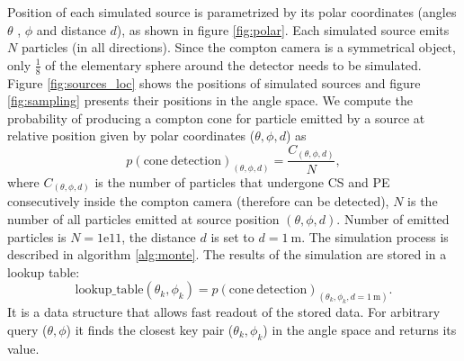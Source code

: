 Position of each simulated source is parametrized by its polar coordinates (angles $\theta$ , $\phi$ and distance $d$), as shown in figure \ref{fig:polar}.
Each simulated source emits $N$ particles (in all directions).
Since the compton camera is a symmetrical object, only $\frac{1}{8}$ of the elementary sphere around the detector needs to be simulated.
Figure \ref{fig:sources_loc} shows the positions of simulated sources and figure \ref{fig:sampling} presents their positions in the angle space.
We compute the probability of producing a compton cone for particle emitted by a source at relative position given by polar coordinates ($\theta, \phi, d$) as
\begin{equation}
  p(\mathrm{cone\ detection})_{(\theta, \phi, d)} = \frac{C_{(\theta, \phi, d)}}{N},
\end{equation} 
where $C_{(\theta, \phi, d)}$ is the number of particles that undergone \ac{CS} and \ac{PE} consecutively inside the compton camera (therefore can be detected), $N$ is the number of all particles emitted at source position $(\theta, \phi, d)$. 
Number of emitted particles is $N = 1\mathrm{e}11$, the distance $d$ is set to $d = \SI{1}\meter$.
The simulation process is described in algorithm \ref{alg:monte}. 
The results of the simulation are stored in a lookup table:
\begin{equation}
  \mathrm{lookup\_table}(\theta_{k}, \phi_{k}) = p(\mathrm{cone\ detection})_{(\theta_{k}, \phi_{k}, d = \SI{1}\meter)}. 
\end{equation}
It is a data structure that allows fast readout of the stored data.
For arbitrary query ($\theta, \phi$) it finds the closest key pair ($\theta_{k}, \phi_{k}$) in the angle space and returns its value.%

